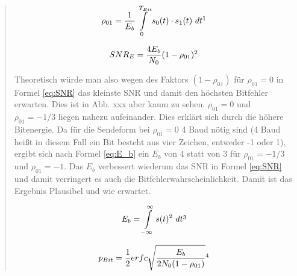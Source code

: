 \begin{quote}
       \vspace{2em}
  
  
    \begin{equation}
	     \begin{split}
		\rho_{01}=\frac{1}{E_{b}} \int\limits_{0}^{T_{Bit}}  s_{0}(t) \cdot s_{1}(t)  \ dt
           \footnotemark
	     \end{split}
    \end{equation} 
     \label{eq:rho01}
    
    \begin{equation}
	     \begin{split}
		SNR_{E}=\frac{4E_{b}}{N_{0}}(1-\rho_{01})
           \footnotemark
	     \end{split}
    \end{equation}  
     \label{eq:SNR}
           
    Theoretisch würde man also wegen des Faktors $(1-\rho_{01})$ für $\rho_{01}=0$ in Formel \ref{eq:SNR} das kleinste
    SNR und damit den höchsten Bitfehler erwarten. Dies ist in Abb. xxx aber kaum zu sehen. $\rho_{01}=0$ und
    $\rho_{01}=-1/3$ liegen nahezu aufeinander. Dies erklärt sich durch die höhere Bitenergie. Da für die
    Sendeform bei $\rho_{01}=0$ 4 Baud nötig sind (4 Baud heißt in diesem Fall ein Bit besteht aus vier Zeichen,
    entweder -1 oder 1), ergibt sich nach Formel \ref{eq:E_b} ein $E_{b}$ von 4 statt von 3 für $\rho_{01} = -1/3$ und
    $\rho_{01}= -1$. Das $E_{b}$ verbessert wiederum das SNR in Formel \ref{eq:SNR} und damit verringert es auch die
    Bitfehlerwahrscheinlichkeit. Damit ist das Ergebnis Plausibel und wie erwartet. 
    
    \begin{equation}
        \begin{split}
            E_{b}= \int\limits_{-\infty}^{\infty} s(t)^2 \ dt
        \end{split}
        \footnotemark
    \end{equation}  
    \label{eq:E_b}
    
    \begin{equation}
	     \begin{split}
		p_{Bit}=\frac{1}{2}erfc  \sqrt{\frac{E_{b}}{2N_{0}(1-\rho_{01})}}
           \footnotemark
	     \end{split}
    \end{equation}  
	 \label{eq:p_bit}
        

\end{quote}
